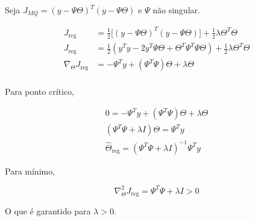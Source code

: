 \documentclass{article}
\begin{document}
Seja $J_{MQ}=(y-\Psi\Theta)^{T}(y-\Psi\Theta)$ e $\Psi$ não singular.

\begin{align*}
    J_{\text{reg}}&=\tfrac12\big[(y-\Psi\Theta)^{T}(y-\Psi\Theta)\big]+\tfrac12\lambda\Theta^{T}\Theta \\
    J_{\text{reg}}&=\tfrac12(y^{T}y-2y^{T}\Psi\Theta+\Theta^{T}\Psi^{T}\Psi\Theta)+\tfrac12\lambda\Theta^{T}\Theta \\
    \nabla_{\Theta}J_{\text{reg}}&=-\Psi^{T}y+(\Psi^{T}\Psi)\Theta+\lambda\Theta \\
\end{align*}

Para ponto crítico,

\begin{gather*}
    0=-\Psi^{T}y+(\Psi^{T}\Psi)\Theta+\lambda\Theta \\
    (\Psi^{T}\Psi+\lambda I)\Theta=\Psi^{T}y \\
    \hat\Theta_{\text{reg}}=(\Psi^{T}\Psi+\lambda I)^{-1}\Psi^{T}y
\end{gather*}

Para mínimo,

\begin{equation*}
    \nabla^{2}_{\Theta}J_{\text{reg}}=\Psi^{T}\Psi+\lambda I>0
\end{equation*}

O que é garantido para $\lambda>0$.
\end{document}
